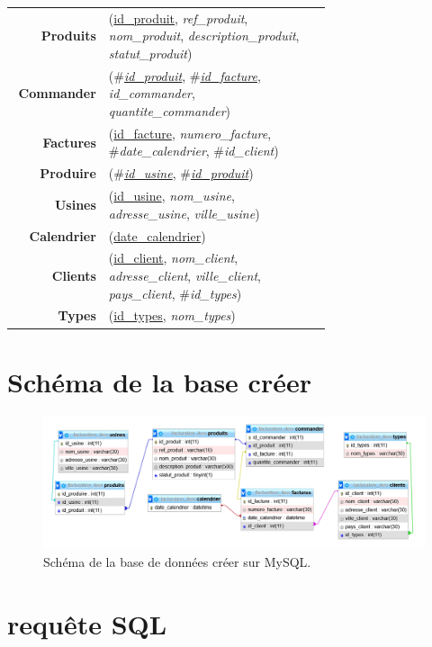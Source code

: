 \documentclass[french]{article}
\newenvironment{mld}
  {\par\begin{minipage}{\linewidth}\begin{tabular}{rp{0.7\linewidth}}}
  {\end{tabular}\end{minipage}\par}
\newcommand{\attr}[1]{\emph{#1}}
\newcommand{\prim}[1]{\uline{#1}}
\newcommand{\foreign}[1]{\#\textsl{#1}}
\begin{document}
\begin{mld}
  \textbf{Produits} & (\prim{id\_produit}, \attr{ref\_produit}, \attr{nom\_produit}, \attr{description\_produit}, \attr{statut\_produit})\\
  \textbf{Commander} & (\foreign{\prim{id\_produit}}, \foreign{\prim{id\_facture}}, \attr{id\_commander}, \attr{quantite\_commander})\\
  \textbf{Factures} & (\prim{id\_facture}, \attr{numero\_facture}, \foreign{date\_calendrier}, \foreign{id\_client})\\
  \textbf{Produire} & (\foreign{\prim{id\_usine}}, \foreign{\prim{id\_produit}})\\
  \textbf{Usines} & (\prim{id\_usine}, \attr{nom\_usine}, \attr{adresse\_usine}, \attr{ville\_usine})\\
  \textbf{Calendrier} & (\prim{date\_calendrier})\\
  \textbf{Clients} & (\prim{id\_client}, \attr{nom\_client}, \attr{adresse\_client}, \attr{ville\_client}, \attr{pays\_client}, \foreign{id\_types})\\
  \textbf{Types} & (\prim{id\_types}, \attr{nom\_types})\\
\end{mld}

\newpage
\section{Schéma de la base créer}

\begin{figure}[!htbp]
    \centering
    \includegraphics[width=\textwidth]{Rapport/Image/schema_bdd.PNG}
    \caption{Schéma de la base de données créer sur MySQL.}
    \label{fig:schema_bdd}
\end{figure}


\section{requête SQL}
\end{document}
